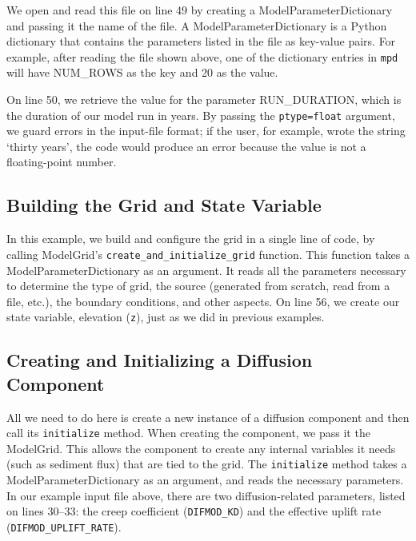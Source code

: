 \documentclass[12pt]{article}
\newcommand{\code}[1]{{\tt #1}}
\begin{document}
We open and read this file on line 49 by creating a ModelParameterDictionary and passing it the name of the file. A ModelParameterDictionary is a Python dictionary that contains the parameters listed in the file as key-value pairs. For example, after reading the file shown above, one of the dictionary entries in \code{mpd} will have NUM\_ROWS as the key and 20 as the value. 

On line 50, we retrieve the value for the parameter RUN\_DURATION, which is the duration of our model run in years. By passing the \code{ptype=float} argument, we guard errors in the input-file format; if the user, for example, wrote the string `thirty years', the code would produce an error because the value is not a floating-point number.

\subsection{Building the Grid and State Variable}



In this example, we build and configure the grid in a single line of code, by calling ModelGrid's \code{create\_and\_initialize\_grid} function. This function takes a ModelParameterDictionary as an argument. It reads all the parameters necessary to determine the type of grid, the source (generated from scratch, read from a file, etc.), the boundary conditions, and other aspects. On line 56, we create our state variable, elevation (\code{z}), just as we did in previous examples.

\subsection{Creating and Initializing a Diffusion Component}



All we need to do here is create a new instance of a diffusion component and then call its \code{initialize} method. When creating the component, we pass it the ModelGrid. This allows the component to create any internal variables it needs (such as sediment flux) that are tied to the grid. The \code{initialize} method takes a ModelParameterDictionary as an argument, and reads the necessary parameters. In our example input file above, there are two diffusion-related parameters, listed on lines 30--33: the creep coefficient (\code{DIFMOD\_KD}) and the effective uplift rate (\code{DIFMOD\_UPLIFT\_RATE}).
\end{document}
